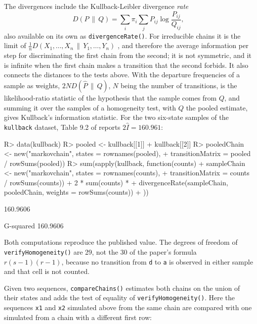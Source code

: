 \documentclass[
  nojss]{jss}
\begin{document}
The divergences include the Kullback-Leibler divergence \emph{rate}
\[
D(P\,\|\,Q) = \sum_i \pi_i \sum_j P_{ij}\log\frac{P_{ij}}{Q_{ij}},
\]
also available on its own as \texttt{divergenceRate()}. For irreducible chains it
is the limit of \(\frac1n D(X_1,\ldots,X_n\,\|\,Y_1,\ldots,Y_n)\)
\citep{rached2004kullback}, and therefore the average information per step
for discriminating the first chain from the second; it is not symmetric,
and it is infinite when the first chain makes a transition that the second
forbids. It also connects the distances to the tests above. With the
departure frequencies of a sample as weights, \(2N D(\hat P\,\|\,Q)\), \(N\)
being the number of transitions, is the likelihood-ratio statistic of the
hypothesis that the sample comes from \(Q\), and summing it over the samples
of a homogeneity test, with \(Q\) the pooled estimate, gives Kullback's
information statistic. For the two six-state samples of the \texttt{kullback}
dataset, Table 9.2 of \cite{kullback1962tests} reports \(2\hat I = 160.961\):

\begin{CodeChunk}
\begin{CodeInput}
R> data(kullback)
R> pooled <- kullback[[1]] + kullback[[2]]
R> pooledChain <- new("markovchain", states = rownames(pooled),
+                    transitionMatrix = pooled / rowSums(pooled))
R> sum(sapply(kullback, function(counts) {
+   sampleChain <- new("markovchain", states = rownames(counts),
+                      transitionMatrix = counts / rowSums(counts))
+   2 * sum(counts) *
+     divergenceRate(sampleChain, pooledChain, weights = rowSums(counts))
+ }))
\end{CodeInput}
\begin{CodeOutput}
[1] 160.9606
\end{CodeOutput}
\begin{CodeOutput}
G-squared 
 160.9606 
\end{CodeOutput}
\end{CodeChunk}

Both computations reproduce the published value. The degrees of freedom of
\texttt{verifyHomogeneity()} are 29, not the 30 of the paper's formula \(r(s-1)(r-1)\),
because no transition from \texttt{d} to \texttt{a} is observed in either sample and that
cell is not counted.

Given two sequences, \texttt{compareChains()} estimates both chains on the union of
their states and adds the test of equality of \texttt{verifyHomogeneity()}. Here the
sequences \texttt{x1} and \texttt{x2} simulated above from the same chain are compared with
one simulated from a chain with a different first row:
\end{document}
